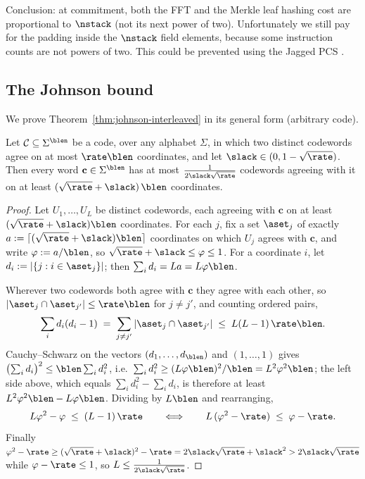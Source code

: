Conclusion: at commitment, both the FFT and the Merkle leaf hashing cost are proportional to $\nstack$ (not its next power of two). Unfortunately we still pay for the padding inside the $\nstack$ field elements, because some instruction counts are not powers of two. This could be prevented using the Jagged PCS \cite{jagged_pcs}.


\subsection{The Johnson bound}\label{app:johnson}

We prove Theorem~\ref{thm:johnson-interleaved} in its general form (arbitrary code).

\begin{theorem}\label{thm:johnson-general}
Let $\mathcal{C} \subseteq \Sigma^\blen$ be a code, over any alphabet $\Sigma$, in which two distinct codewords agree on at most $\rate \blen$ coordinates, and let $\slack \in (0, 1 - \sqrt{\rate})$. Then every word $\mathbf{c} \in \Sigma^\blen$ has at most $\tfrac{1}{2\slack\sqrt{\rate}}$ codewords agreeing with it on at least $(\sqrt{\rate} + \slack)\, \blen$ coordinates.
\end{theorem}

\begin{proof}
Let $U_1, \dots, U_L$ be distinct codewords, each agreeing with $\mathbf{c}$ on at least $(\sqrt{\rate}+\slack) \blen$ coordinates. For each $j$, fix a set $\aset_j$ of exactly $a := \lceil (\sqrt{\rate}+\slack) \blen \rceil$ coordinates on which $U_j$ agrees with $\mathbf{c}$, and write $\varphi := a/\blen$, so $\sqrt{\rate} + \slack \le \varphi \le 1$. For a coordinate $i$, let $d_i := |\{ j : i \in \aset_j \}|$; then $\sum_i d_i = L a = L \varphi \blen$.

Wherever two codewords both agree with $\mathbf{c}$ they agree with each other, so $|\aset_j \cap \aset_{j'}| \le \rate \blen$ for $j \neq j'$, and counting ordered pairs,
\[
\sum_i d_i (d_i - 1) \;=\; \sum_{j \neq j'} |\aset_j \cap \aset_{j'}| \;\le\; L(L-1)\, \rate \blen .
\]
Cauchy--Schwarz on the vectors $(d_1, \dots, d_\blen)$ and $(1, \dots, 1)$ gives $\bigl(\sum_i d_i\bigr)^2 \le \blen \sum_i d_i^2$, i.e.\ $\sum_i d_i^2 \ge (L \varphi \blen)^2 / \blen = L^2 \varphi^2 \blen$; the left side above, which equals $\sum_i d_i^2 - \sum_i d_i$, is therefore at least $L^2 \varphi^2 \blen - L \varphi \blen$. Dividing by $L\blen$ and rearranging,
\[
L \varphi^2 - \varphi \;\le\; (L-1)\, \rate
\qquad\Longleftrightarrow\qquad
L\, (\varphi^2 - \rate) \;\le\; \varphi - \rate .
\]
Finally $\varphi^2 - \rate \ge (\sqrt{\rate}+\slack)^2 - \rate = 2\slack\sqrt{\rate} + \slack^2 > 2\slack\sqrt{\rate}$ while $\varphi - \rate \le 1$, so $L \le \tfrac{1}{2\slack\sqrt{\rate}}$.
\end{proof}

